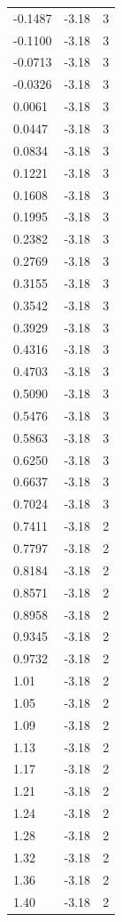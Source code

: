\begin{longtable}{lrr}
  -0.1487 & -3.18 & 3 \\
  -0.1100 & -3.18 & 3 \\
  -0.0713 & -3.18 & 3 \\
  -0.0326 & -3.18 & 3 \\
  0.0061 & -3.18 & 3 \\
  0.0447 & -3.18 & 3 \\
  0.0834 & -3.18 & 3 \\
  0.1221 & -3.18 & 3 \\
  0.1608 & -3.18 & 3 \\
  0.1995 & -3.18 & 3 \\
  0.2382 & -3.18 & 3 \\
  0.2769 & -3.18 & 3 \\
  0.3155 & -3.18 & 3 \\
  0.3542 & -3.18 & 3 \\
  0.3929 & -3.18 & 3 \\
  0.4316 & -3.18 & 3 \\
  0.4703 & -3.18 & 3 \\
  0.5090 & -3.18 & 3 \\
  0.5476 & -3.18 & 3 \\
  0.5863 & -3.18 & 3 \\
  0.6250 & -3.18 & 3 \\
  0.6637 & -3.18 & 3 \\
  0.7024 & -3.18 & 3 \\
  0.7411 & -3.18 & 2 \\
  0.7797 & -3.18 & 2 \\
  0.8184 & -3.18 & 2 \\
  0.8571 & -3.18 & 2 \\
  0.8958 & -3.18 & 2 \\
  0.9345 & -3.18 & 2 \\
  0.9732 & -3.18 & 2 \\
  1.01 & -3.18 & 2 \\
  1.05 & -3.18 & 2 \\
  1.09 & -3.18 & 2 \\
  1.13 & -3.18 & 2 \\
  1.17 & -3.18 & 2 \\
  1.21 & -3.18 & 2 \\
  1.24 & -3.18 & 2 \\
  1.28 & -3.18 & 2 \\
  1.32 & -3.18 & 2 \\
  1.36 & -3.18 & 2 \\
  1.40 & -3.18 & 2 \\

\end{longtable}
